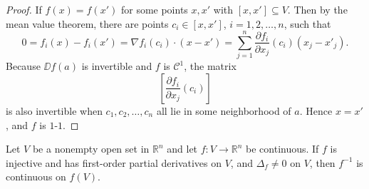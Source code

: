 \documentclass[11pt]{article}
\begin{document}
\begin{proof}
  If $f(x) = f(x')$ for some points $x, x'$ with $[x,x'] \subseteq V$.  Then by the mean value theorem, there are points $c_i \in [x,x']$, $i=1,2,\dots,n$, such that
  \begin{equation*}
    0 = f_i(x) - f_i(x') = \nabla f_i(c_i) \cdot (x - x')
    = \sum_{j=1}^n \frac{\partial f_i}{\partial x_j}(c_i) (x_j - x'_j).
  \end{equation*}
  Because $\DD f(a)$ is invertible and $f$ is $\mathcal C^1$, the matrix
  \begin{equation*}
    \left[
      \frac{\partial f_i}{\partial x_j} (c_i)
    \right]
  \end{equation*}
  is also invertible when $c_1, c_2, \dots, c_n$ all lie in some neighborhood of $a$.
  Hence $x = x'$, and $f$ is $1$-$1$.
\end{proof}


\begin{lem}
  Let $V$ be a nonempty open set in $\mathbb R^n$ and let $f:V \to \mathbb R^n$ be continuous.
  If $f$ is injective and has first-order partial derivatives on $V$, and $\Delta_f \neq 0$ on $V$, then $f^{-1}$ is continuous on $f(V)$.
\end{lem} 
\end{document}
